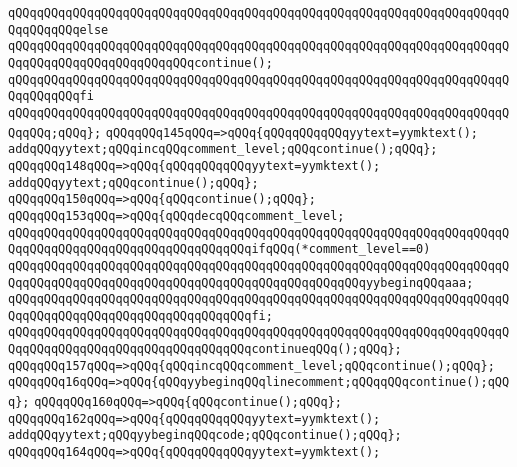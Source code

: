 \verb|qQQqqQQqqQQqqQQqqQQqqQQqqQQqqQQqqQQqqQQqqQQqqQQqqQQqqQQqqQQqqQQqqQQqqQQqqQQqqQQqelse|\newline
\verb|qQQqqQQqqQQqqQQqqQQqqQQqqQQqqQQqqQQqqQQqqQQqqQQqqQQqqQQqqQQqqQQqqQQqqQQqqQQqqQQqqQQqqQQqqQQqqQQqcontinue();|\newline
\verb|qQQqqQQqqQQqqQQqqQQqqQQqqQQqqQQqqQQqqQQqqQQqqQQqqQQqqQQqqQQqqQQqqQQqqQQqqQQqqQQqfi|\newline
\verb|qQQqqQQqqQQqqQQqqQQqqQQqqQQqqQQqqQQqqQQqqQQqqQQqqQQqqQQqqQQqqQQqqQQqqQQqqQQq;qQQq};|\newline
\verb|qQQqqQQq145qQQq=>qQQq{qQQqqQQqqQQqyytext=yymktext();|\newline
\verb|addqQQqyytext;qQQqincqQQqcomment_level;qQQqcontinue();qQQq};|\newline
\verb|qQQqqQQq148qQQq=>qQQq{qQQqqQQqqQQqyytext=yymktext();|\newline
\verb|addqQQqyytext;qQQqcontinue();qQQq};|\newline
\verb|qQQqqQQq150qQQq=>qQQq{qQQqcontinue();qQQq};|\newline
\verb|qQQqqQQq153qQQq=>qQQq{qQQqdecqQQqcomment_level;|\newline
\verb|qQQqqQQqqQQqqQQqqQQqqQQqqQQqqQQqqQQqqQQqqQQqqQQqqQQqqQQqqQQqqQQqqQQqqQQqqQQqqQQqqQQqqQQqqQQqqQQqqQQqqQQqifqQQq(*comment_level==0)|\newline
\verb|qQQqqQQqqQQqqQQqqQQqqQQqqQQqqQQqqQQqqQQqqQQqqQQqqQQqqQQqqQQqqQQqqQQqqQQqqQQqqQQqqQQqqQQqqQQqqQQqqQQqqQQqqQQqqQQqqQQqqQQqyybeginqQQqaaa;|\newline
\verb|qQQqqQQqqQQqqQQqqQQqqQQqqQQqqQQqqQQqqQQqqQQqqQQqqQQqqQQqqQQqqQQqqQQqqQQqqQQqqQQqqQQqqQQqqQQqqQQqqQQqqQQqfi;|\newline
\verb|qQQqqQQqqQQqqQQqqQQqqQQqqQQqqQQqqQQqqQQqqQQqqQQqqQQqqQQqqQQqqQQqqQQqqQQqqQQqqQQqqQQqqQQqqQQqqQQqqQQqqQQqcontinueqQQq();qQQq};|\newline
\verb|qQQqqQQq157qQQq=>qQQq{qQQqincqQQqcomment_level;qQQqcontinue();qQQq};|\newline
\verb|qQQqqQQq16qQQq=>qQQq{qQQqyybeginqQQqlinecomment;qQQqqQQqcontinue();qQQq};|\newline
\verb|qQQqqQQq160qQQq=>qQQq{qQQqcontinue();qQQq};|\newline
\verb|qQQqqQQq162qQQq=>qQQq{qQQqqQQqqQQqyytext=yymktext();|\newline
\verb|addqQQqyytext;qQQqyybeginqQQqcode;qQQqcontinue();qQQq};|\newline
\verb|qQQqqQQq164qQQq=>qQQq{qQQqqQQqqQQqyytext=yymktext();|\newline
